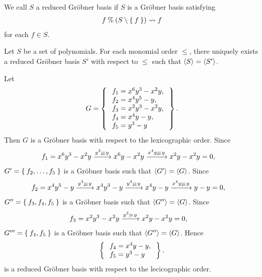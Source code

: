 \begin{definition}
  We call  $S$ a reduced Gr\"obner basis
  if $S$ is a Gr\"obner basis satisfying
  \begin{align*}
    f\mathbin{\%} (S\setminus\Set{f}) \leadsto f
  \end{align*}
  for each $f\in S$.
\end{definition}

\begin{theorem}
  Let $S$ be  a set of polynomials.
  For each monomial order $\leq$,
  there uniquely exists
  a reduced Gr\"obner basis $S'$ with respect to $\leq$
  such that $\Braket{S}=\Braket{S'}$.
\end{theorem}

\begin{example}
Let
  \begin{align*}
  G=\Set{
    \begin{array}{l}
      f_1=x^6y^3-x^2y,\\
      f_2=x^4y^5-y,\\
      f_3=x^2y^3-x^2y,\\
      f_4=x^4y-y,\\
      f_5=y^3-y
    \end{array}
  }.
\end{align*}
  Then $G$ is a Gr\"obner basis
  with respect to the lexicographic order.
  Since
  \begin{align*}
    f_1&=x^6y^3-x^2y
    \xrightarrow{y^3\Denotes y}
    x^6y-x^2y
    \xrightarrow{x^4y\Denotes y}
    x^2y-x^2y=0,
  \end{align*}
  $G'=\Set{f_2,\ldots,f_5}$ is a Gr\"obner basis
  such that $\Braket{G'}=\Braket{G}$.
  Since
  \begin{align*}
    f_2&=x^4y^5-y
    \xrightarrow{y^3\Denotes y}
    x^4y^3-y
    \xrightarrow{y^3\Denotes y}
    x^4y-y
    \xrightarrow{x^4y\Denotes y}
    y-y=0,
  \end{align*}
  $G''=\Set{f_3,f_4,f_5}$ is a Gr\"obner basis
  such that $\Braket{G''}=\Braket{G}$.
  Since
  \begin{align*}
    f_3&=x^2y^3-x^2y
    \xrightarrow{y^3\Denotes y}
    x^2y-x^2y=0,
  \end{align*}
  $G'''=\Set{f_4,f_5}$ is a Gr\"obner basis
  such that $\Braket{G''}=\Braket{G}$.
  Hence
  \begin{align*}
  \Set{
    \begin{array}{l}
      f_4=x^4y-y,\\
      f_5=y^3-y
    \end{array}
  }.
  \end{align*}
  is a reduced Gr\"obner basis
  with respect to the lecicographic order.
\end{example}


